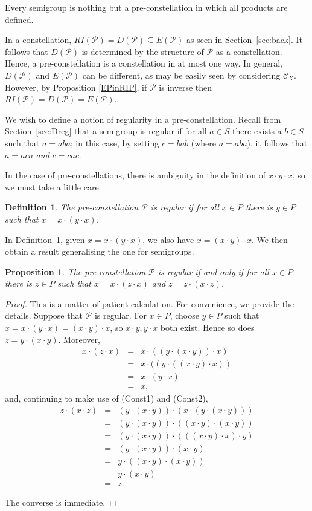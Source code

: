 \documentclass[12pt]{amsart}
\newtheorem{pro}[thm]{Proposition}
\newtheorem{dfn}[thm]{Definition}
\theoremstyle{definition}
\newcommand{\bea}{\begin{eqnarray*}}
\newcommand{\eea}{\end{eqnarray*}}
\newcommand{\Pcon}{\mathcal P}
\newcommand{\C}{\mathcal C}
\begin{document}
Every semigroup is nothing but a pre-constellation in which all products are defined. 

In a constellation, $RI(\Pcon)=D(\Pcon)\subseteq E(\Pcon)$ as seen in Section~\ref{sec:back}. It follows that $D(\Pcon)$ is determined by the structure of $\Pcon$ as a constellation.  Hence, a pre-constellation is a constellation in at most one way.  In general, $D(\Pcon)$ and $E(\Pcon)$ can be different, as may be easily seen by considering $\C_X$.  However, by Proposition \ref{EPinRIP}, if $\Pcon$ is inverse then $RI(\Pcon)=D(\Pcon)=E(\Pcon)$.

We wish to define a notion of regularity in a pre-constellation.  Recall from Section~\ref{sec:Dreg} that a semigroup is regular if for all $a\in S$ there exists a $b\in S$ such that $a=aba$; in this case, by setting $c=bab$ (where $a=aba$), it follows that $a=aca$ {\em and} $c=cac$.

In the case of pre-constellations, there is ambiguity in the definition of $x\cdot y\cdot x$, so we must take a little care.

\begin{dfn}\label{defn:regp}
The pre-constellation $\Pcon$ is {\em regular} if for all $x\in P$ there is $y\in P$ such that $x=x\cdot(y\cdot x)$.
\end{dfn}

In Definition~\ref{defn:regp}, given $x=x\cdot(y\cdot x)$, we also have
$x=(x\cdot y)\cdot x$.  We then obtain a result generalising the  one for semigroups.

\begin{pro}
The pre-constellation $\Pcon$ is regular if and only if for all $x\in P$ there is $z\in P$ such that $x=x\cdot(z\cdot x)$ and $z=z\cdot (x\cdot z)$.
\end{pro}
\begin{proof}  This is a matter of patient calculation. For convenience, we provide the details.  Suppose that $\Pcon$ is regular.  For $x\in P$, choose $y\in P$ such that $x=x\cdot(y\cdot x)=(x\cdot y)\cdot x$, so $x\cdot y,y\cdot x$ both exist.  Hence so does $z=y\cdot(x\cdot y)$.  Moreover,
\bea
x\cdot(z\cdot x)&=&x\cdot ((y\cdot (x\cdot y))\cdot x)\\
&=&x\cdot ((y\cdot ((x\cdot y)\cdot x))\\
&=&x\cdot (y\cdot x)\\
&=&x,
\eea
and, continuing to  make use of (Const1) and (Const2),
\bea
z\cdot (x\cdot z)&=& (y\cdot (x\cdot y))\cdot (x\cdot (y\cdot (x\cdot y)))\\
&=&(y\cdot (x\cdot y))\cdot ((x\cdot y)\cdot (x\cdot y))\\
&=&(y\cdot (x\cdot y))\cdot (((x\cdot y)\cdot x)\cdot y)\\
&=&(y\cdot (x\cdot y))\cdot (x\cdot y)\\
&=&y\cdot ((x\cdot y)\cdot (x\cdot y))\\
&=&y\cdot (x\cdot y)\\
&=&z.
\eea

The converse is immediate.
\end{proof}
\end{document}
